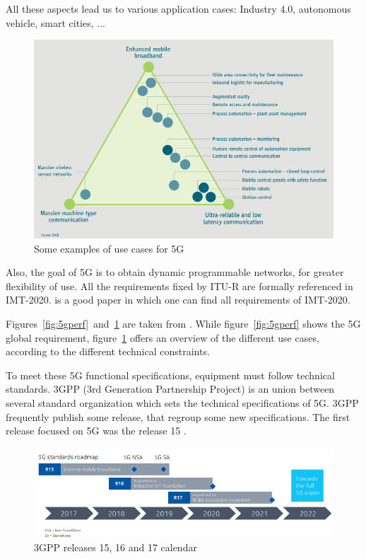\documentclass[a4paper,10pt]{article}
\begin{document}
All these aspects lead us to various application cases: Industry 4.0, autonomous vehicle, smart cities, ... 

  \begin{figure}[h] 
      \begin{center}
      \includegraphics[width=1\textwidth]{usecases.png}
      \end{center}
      \caption{Some examples of use cases for 5G}\label{fig:usecases}
      \end{figure}
          
Also, the goal of 5G is to obtain dynamic programmable networks, for greater flexibility of use. All the requirements fixed by ITU-R are formally referenced in IMT-2020. \cite{dahlman20185g} is a good paper in which one can find all requirements of IMT-2020.

Figures~\ref{fig:5gperf}~and~\ref{fig:usecases} are taken from \cite{5GACIA}. While figure~\ref{fig:5gperf} shows the 5G global requirement, figure~\ref{fig:usecases} offers an overview of the different use cases, according to the different technical constraints.
 

To meet these 5G functional specifications, equipment must follow technical standards. 3GPP (3rd Generation Partnership Project) is an union between several standard organization which sets the technical specifications of 5G. 3GPP frequently publish some release, that regroup some new specifications. The first release focused on 5G was the release 15 \cite{RELEASENOKIA}.  

  \begin{figure}[h]
      \begin{center}
      \includegraphics[width=1\textwidth]{release.png}
      \end{center}
      \caption{3GPP releases 15, 16 and 17 calendar}\label{fig:release}
      \end{figure}
  
\end{document}
